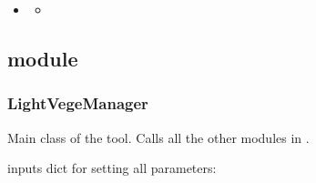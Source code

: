 \documentclass[letterpaper,10pt,english]{sphinxmanual}
\begin{document}
\begin{sphinxShadowBox}
\begin{itemize}
\begin{itemize}
\begin{itemize}
\end{itemize}

\item {} 
\sphinxAtStartPar
{}\label{\detokenize{reference:id36}}{\hyperref[\detokenize{reference:module-voxelsmesh}]{}}
\begin{itemize}
\item {} 
\sphinxAtStartPar
{}\label{\detokenize{reference:id37}}{\hyperref[\detokenize{reference:voxelsmesh}]{}}

\end{itemize}

\end{itemize}

\end{itemize}
\end{sphinxShadowBox}


\subsection{ module}
\label{\detokenize{reference:module-LVM}}\label{\detokenize{reference:lvm-module}}

\subsubsection{LightVegeManager}
\label{\detokenize{reference:lightvegemanager}}
\sphinxAtStartPar
Main class of the tool. Calls all the other modules in .

 inputs dict for setting all parameters:
\end{document}
